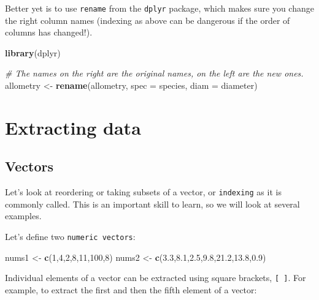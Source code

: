 \documentclass[]{book}
\newenvironment{Shaded}{\begin{snugshade}}{\end{snugshade}}
\newcommand{\CommentTok}[1]{\textcolor[rgb]{0.56,0.35,0.01}{\textit{#1}}}
\newcommand{\DataTypeTok}[1]{\textcolor[rgb]{0.13,0.29,0.53}{#1}}
\newcommand{\DecValTok}[1]{\textcolor[rgb]{0.00,0.00,0.81}{#1}}
\newcommand{\FloatTok}[1]{\textcolor[rgb]{0.00,0.00,0.81}{#1}}
\newcommand{\KeywordTok}[1]{\textcolor[rgb]{0.13,0.29,0.53}{\textbf{#1}}}
\newcommand{\NormalTok}[1]{#1}
\newcommand{\StringTok}[1]{\textcolor[rgb]{0.31,0.60,0.02}{#1}}
\begin{document}
Better yet is to use \texttt{rename} from the \texttt{dplyr} package, which makes sure you change the right column names (indexing as above can be dangerous if the order of columns has changed!).

\begin{Shaded}
\begin{Highlighting}[]
\KeywordTok{library}\NormalTok{(dplyr)}

\CommentTok{# The names on the right are the original names, on the left are the new ones.}
\NormalTok{allometry <-}\StringTok{ }\KeywordTok{rename}\NormalTok{(allometry, }
                       \DataTypeTok{spec =}\NormalTok{ species,}
                       \DataTypeTok{diam =}\NormalTok{ diameter)}
\end{Highlighting}
\end{Shaded}

\hypertarget{extracting-data}{%
\section{Extracting data}\label{extracting-data}}

\hypertarget{vectorindexing}{%
\subsection{Vectors}\label{vectorindexing}}

Let's look at reordering or taking subsets of a vector, or \texttt{indexing} as it is commonly called. This is an important skill to learn, so we will look at several examples.

Let's define two \texttt{numeric\ vectors}:

\begin{Shaded}
\begin{Highlighting}[]
\NormalTok{nums1 <-}\StringTok{ }\KeywordTok{c}\NormalTok{(}\DecValTok{1}\NormalTok{,}\DecValTok{4}\NormalTok{,}\DecValTok{2}\NormalTok{,}\DecValTok{8}\NormalTok{,}\DecValTok{11}\NormalTok{,}\DecValTok{100}\NormalTok{,}\DecValTok{8}\NormalTok{)}
\NormalTok{nums2 <-}\StringTok{ }\KeywordTok{c}\NormalTok{(}\FloatTok{3.3}\NormalTok{,}\FloatTok{8.1}\NormalTok{,}\FloatTok{2.5}\NormalTok{,}\FloatTok{9.8}\NormalTok{,}\FloatTok{21.2}\NormalTok{,}\FloatTok{13.8}\NormalTok{,}\FloatTok{0.9}\NormalTok{)}
\end{Highlighting}
\end{Shaded}

Individual elements of a vector can be extracted using square brackets, \texttt{{[}\ {]}}. For example, to extract the first and then the fifth element of a vector:
\end{document}
